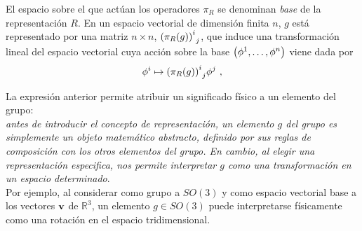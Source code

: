 El espacio sobre el que actúan los operadores $\pi_{R}$ se denominan \emph{base} de la representación $R$. En un espacio vectorial de dimensión finita $n$, $g$ está representado por una matriz $n\times n$, $\qty(\pi_{R}(g))^{i}_{~j}$, que induce una transformación lineal del espacio vectorial cuya acción sobre la base $\qty(\phi^{1},\ldots,\phi^{n})$ viene dada por
\begin{equation}
    \phi^{i}\mapsto \qty(\pi_{R}(g))^{i}_{~j}\phi^{j}~,
    \label{eqA2.2}
\end{equation}

La expresión anterior permite atribuir un significado físico a un elemento del grupo:\\

\emph{antes de introducir el concepto de representación, un elemento $g$ del grupo es simplemente un objeto matemático abstracto, definido por sus reglas de composición con los otros elementos del grupo. En cambio, al elegir una representación especifica, nos permite interpretar $g$ como una transformación en un espacio determinado}.\\

Por ejemplo, al considerar como grupo a $SO(3)$ y como espacio vectorial base a los vectores $\vb{v}$ de $\mathbb{R}^{3}$, un elemento $g\in SO(3)$ puede interpretarse físicamente como una rotación en el espacio tridimensional.

